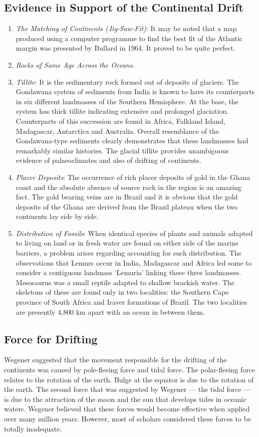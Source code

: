 \documentclass[8pt, a4paper, oneside, twocolumn]{extarticle}
\begin{document}
\subsection{Evidence in Support of the Continental Drift}
\begin{enumerate}
  \item \textit{The Matching of Continents (Jig-Saw-Fit)}: It may be noted that a map produced using a computer programme to find the best fit of the Atlantic margin was presented by Bullard in 1964. It proved to be quite perfect.
  \item \textit{Rocks of Same Age Across the Oceans}.
  \item \textit{Tillite}: It is the sedimentary rock formed out of deposits of glaciers. The Gondawana system of sediments from India is known to have its counterparts in six different landmasses of the Southern Hemisphere. At the base, the system has thick tillite indicating extensive and prolonged glaciation. Counterparts of this succession are found in Africa, Falkland Island, Madagascar, Antarctica and Australia. Overall resemblance of the Gondawana-type sediments clearly demonstrates that these landmasses had remarkably similar histories. The glacial tillite provides unambiguous evidence of palaeoclimates and also of drifting of continents.
  \item \textit{Placer Deposits}: The occurrence of rich placer deposits of gold in the Ghana coast and the absolute absence of source rock in the region is an amazing fact. The gold bearing veins are in Brazil and it is obvious that the gold deposits of the Ghana are derived from the Brazil plateau when the two continents lay side by side.
  \item \textit{Distribution of Fossils}: When identical species of plants and animals adapted to living on land or in fresh water are found on either side of the marine barriers, a problem arises regarding accounting for such distribution. The observations that Lemurs occur in India, Madagascar and Africa led some to consider a contiguous landmass ‘Lemuria’ linking these three landmasses. Mesosaurus was a small reptile adapted to shallow brackish water. The skeletons of these are found only in two localities: the Southern Cape province of South Africa and Iraver formations of Brazil. The two localities are presently 4,800 km apart with an ocean in between them.
\end{enumerate}
\subsection{Force for Drifting}
Wegener suggested that the movement responsible for the drifting of the continents was caused by pole-fleeing force and tidal force. The polar-fleeing force relates to the rotation of the earth. Bulge at the equator is due to the rotation of the earth. The second force that was suggested by Wegener — the tidal force — is due to the attraction of the moon and the sun that develops tides in oceanic waters. Wegener believed that these forces would become effective when applied over many million years. However, most of scholars considered these forces to be totally inadequate.
\end{document}
